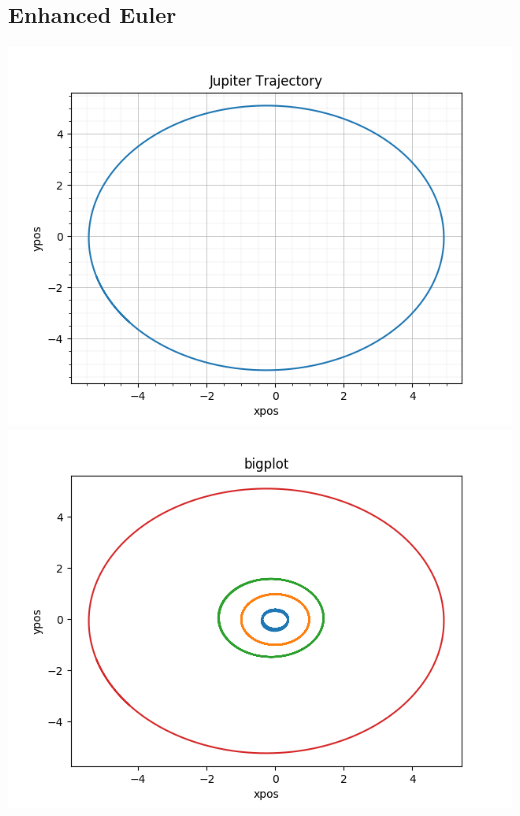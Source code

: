 \documentclass[12pt]{article}
\begin{document}
\subsection{Enhanced Euler}
\includegraphics[scale=0.5]{euler_enhanced_jupiter.png}
\includegraphics[scale=0.5]{euler_enhanced_multiplanet.png}
\end{document}
